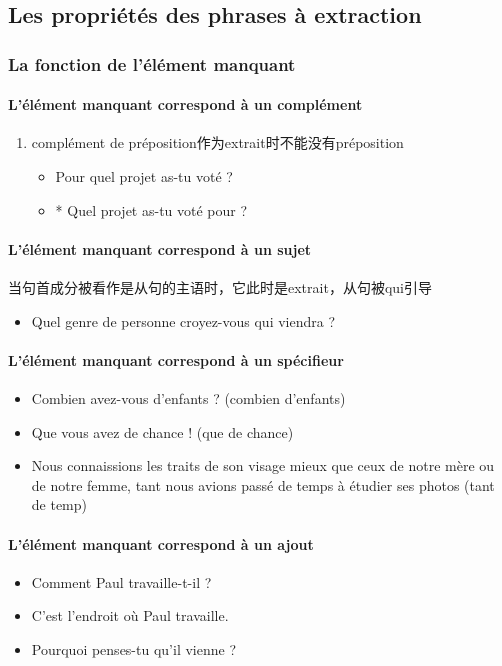 \documentclass[UTF8]{report}
\begin{document}
\subsection{Les propriétés des phrases à extraction}

\subsubsection{La fonction de l’élément manquant}

\paragraph{L’élément manquant correspond à un complément}
\begin{enumerate}
    \item complément de préposition作为extrait时不能没有préposition
    \begin{itemize}
        \item Pour quel projet as-tu voté ?
        \item * Quel projet as-tu voté pour ?
    \end{itemize}
\end{enumerate}
\paragraph{L’élément manquant correspond à un sujet}

当句首成分被看作是从句的主语时，它此时是extrait，从句被qui引导
\begin{itemize}
    \item Quel genre de personne croyez-vous qui viendra ?
\end{itemize}
\paragraph{L’élément manquant correspond à un spécifieur}
\begin{itemize}
    \item Combien avez-vous d’enfants ? (combien d’enfants)
    \item Que vous avez de chance ! (que de chance)
    \item Nous connaissions les traits de son visage mieux que ceux de notre mère ou de notre femme, tant nous avions passé de temps à étudier ses photos (tant de temp)
\end{itemize}
\paragraph{L’élément manquant correspond à un ajout}
\begin{itemize}
    \item Comment Paul travaille-t-il ?
    \item C’est l’endroit où Paul travaille.
    \item Pourquoi penses-tu qu’il vienne ?
\end{itemize}
\end{document}
